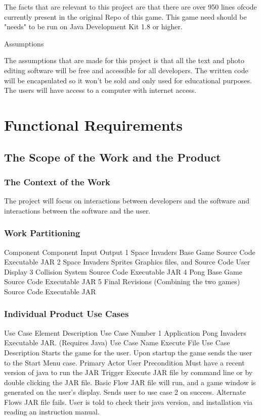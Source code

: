 \documentclass[12pt, titlepage]{article}
\begin{document}
The facts that are relevant to this project are that there are over 950 lines
ofcode currently present in the original Repo of this game. This game need %
should be "needs"
to be run on Java Development Kit 1.8 or higher.

Assumptions

The assumptions that are made for this project is that all the text and photo
editing software will be free and accessible for all developers. The written
code will be encapsulated so it won’t %
be sold and only used for educational purposes. The users will have access to a
computer with internet access.

\section{Functional Requirements}
\subsection{The Scope of the Work and the Product}
\subsubsection{The Context of the Work}
The project will focus on interactions between developers and the software and
interactions between the software and the user.

\subsubsection{Work Partitioning}

Component 
Component
Input
Output
1
Space Invaders Base Game
Source Code
Executable JAR
2
Space Invaders Sprites
Graphics files, and Source Code
User Display
3
Collision System
Source Code
Executable JAR
4
Pong Base Game
Source Code
Executable JAR
5
Final Revisions (Combining the two games)
Source Code
Executable JAR

\subsubsection{Individual Product Use Cases}
Use Case Element
Description
Use Case Number
1
Application
Pong Invaders Executable JAR. (Requires Java)
Use Case Name
Execute File
Use Case Description
Starts the game for the user. Upon startup the game sends the user to the Start
Menu case.
Primary Actor
User 
Precondition
Must have a recent version of java to run the JAR
Trigger
Execute JAR file by command line or by double clicking the JAR file.
Basic Flow
JAR file will run, and a game window is generated on the user’s display. Sends
user to use case 2 on success.
Alternate Flows
JAR file fails. User is told to check their java version, and installation via
reading an instruction manual.
\end{document}
